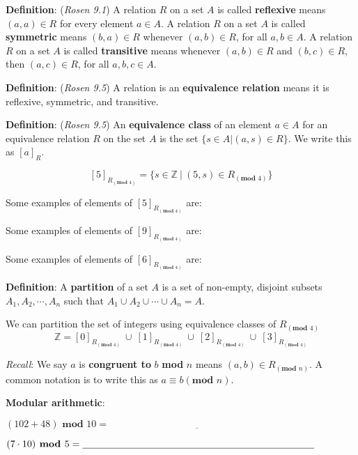 \documentclass[12pt, oneside]{article}
\begin{document}
{\bf Definition}: ({\it Rosen 9.1}) A relation $R$ on a set $A$ is called {\bf reflexive} means $(a, a) \in R$ for every element $a \in A$. A relation $R$ on a set $A$ is called {\bf symmetric} means $(b, a) \in R$ whenever $(a, b) \in R$, for all $a, b \in A$. A relation $R$ on a set $A$ is called {\bf transitive} means whenever $(a, b) \in R$ and $(b, c) \in R$, then $(a, c) \in R$, for all $a, b, c \in A$.


{\bf Definition}: ({\it Rosen 9.5}) A relation is an {\bf equivalence relation} means it is reflexive, symmetric, and transitive.

{\bf Definition}: ({\it Rosen 9.5}) An {\bf equivalence class} of an element $a \in A$ for an equivalence relation $R$ on the set $A$ is the set $\{s \in A | (a, s) \in R \}$. We write this as $[a]_R$.


$$[5]_{R_{(\textbf{mod } 4)}} = \{ s \in \mathbb{Z} ~|~ (5,s) \in R_{{(\textbf{mod } 4)}} \}$$

Some examples of elements of $[5]_{R_{(\textbf{mod } 4)}}$ are: \underline{\hspace{20em}}

Some examples of elements of $[9]_{R_{(\textbf{mod } 4)}}$ are: \underline{\hspace{20em}}

Some examples of elements of $[6]_{R_{(\textbf{mod } 4)}}$ are: \underline{\hspace{20em}}

\vfill

{\bf Definition}: A {\bf partition} of a set $A$ is a set of non-empty, disjoint subsets $A_1, A_2, \cdots, A_n$ such that $A_1 \cup A_2 \cup \cdots \cup A_n = A$.

We can partition the set of integers using equivalence classes of  $R_{(\textbf{mod } 4)}$
\[
\mathbb{Z} =  [0]_{R_{(\textbf{mod } 4)}}~ \cup ~[1]_{R_{(\textbf{mod } 4)}} ~\cup~[2]_{R_{(\textbf{mod } 4)}}~\cup~
[3]_{R_{(\textbf{mod } 4)}}
\]




{\it Recall}: We say $a$ is {\bf congruent to} $b$ \textbf{mod} $n$ means $(a, b) \in R_{(\textbf{mod } n)}$. A common notation is to write this as $a \equiv b (\textbf{mod } n)$.


{\bf Modular arithmetic}: 

$(102 + 48) \textbf{ mod } 10 = \underline{\phantom{\hspace{3in}}} $ 

$(7 \cdot 10) \textbf{ mod } 5 = \underline{\phantom{\hspace{3.3in}}} $ 
\end{document}
